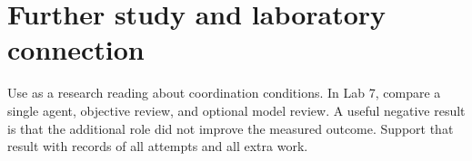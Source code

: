 \section{Further study and laboratory connection}
Use \cite{multiagent-report} as a research reading about coordination conditions. In Lab 7, compare a single agent, objective review, and optional model review. A useful negative result is that the additional role did not improve the measured outcome. Support that result with records of all attempts and all extra work.

